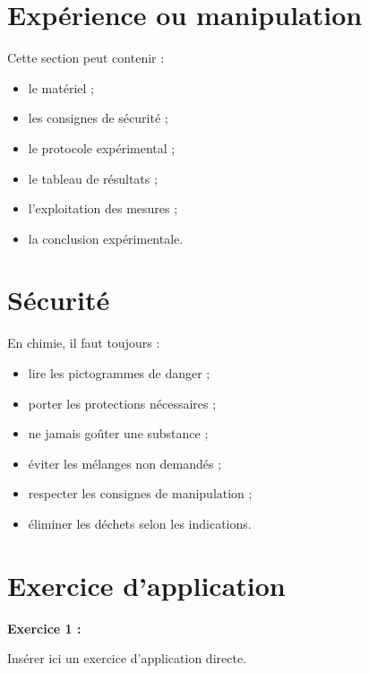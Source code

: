 \documentclass[11pt,a4paper]{article}
\begin{document}
\section{Expérience ou manipulation}

\begin{cadreactivite}
Cette section peut contenir :
\begin{itemize}
    \item le matériel ;
    \item les consignes de sécurité ;
    \item le protocole expérimental ;
    \item le tableau de résultats ;
    \item l’exploitation des mesures ;
    \item la conclusion expérimentale.
\end{itemize}
\end{cadreactivite}

\section{Sécurité}

\begin{cadreattention}
En chimie, il faut toujours :
\begin{itemize}
    \item lire les pictogrammes de danger ;
    \item porter les protections nécessaires ;
    \item ne jamais goûter une substance ;
    \item éviter les mélanges non demandés ;
    \item respecter les consignes de manipulation ;
    \item éliminer les déchets selon les indications.
\end{itemize}
\end{cadreattention}

\section{Exercice d’application}

\begin{cadreenonce}
\textbf{Exercice 1 :}

Insérer ici un exercice d’application directe.
\end{cadreenonce}
\end{document}
